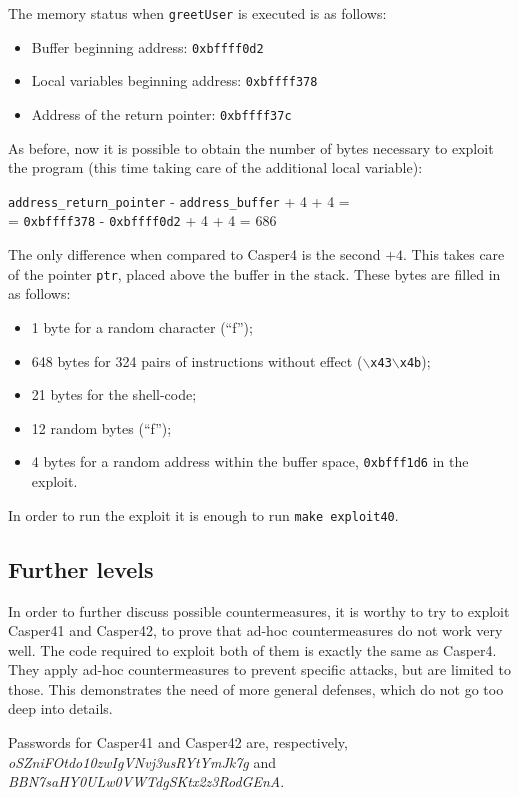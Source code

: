 The memory status when \texttt{greetUser} is executed is as follows:
\begin{itemize}
	\item Buffer beginning address: \texttt{0xbffff0d2}
	\item Local variables beginning address: \texttt{0xbffff378}
	\item Address of the return pointer: \texttt{0xbffff37c}
\end{itemize}
As before, now it is possible to obtain the number of bytes necessary to exploit the program (this time taking care of the additional local variable):

\begin{center}
	\texttt{address\_return\_pointer} - \texttt{address\_buffer} + 4 + 4 =\\
	= \texttt{0xbffff378} - \texttt{0xbffff0d2} + 4 + 4 = 686
\end{center}


The only difference when compared to Casper4 is the second $+ 4$. This takes care of the pointer \texttt{ptr}, placed above the buffer in the stack. These bytes are filled in as follows:
\begin{itemize}
	\item 1 byte for a random character (``f'');
	\item 648 bytes for 324 pairs of instructions without effect (\texttt{$\backslash$x43$\backslash$x4b});
	\item 21 bytes for the shell-code;
	\item 12 random bytes (``f'');
	\item 4 bytes for a random address within the buffer space, \texttt{0xbfff1d6} in the exploit.
\end{itemize}

In order to run the exploit it is enough to run \texttt{make exploit40}.

\subsection{Further levels}
In order to further discuss possible countermeasures, it is worthy to try to exploit Casper41 and Casper42, to prove that ad-hoc countermeasures do not work very well. The code required to exploit both of them is exactly the same as Casper4. They apply ad-hoc countermeasures to prevent specific attacks, but are limited to those. This demonstrates the need of more general defenses, which do not go too deep into details. 

Passwords for Casper41 and Casper42 are, respectively, \\\textit{oSZniFOtdo10zwIgVNvj3usRYtYmJk7g} and \\\textit{BBN7saHY0ULw0VWTdgSKtx2z3RodGEnA}.
